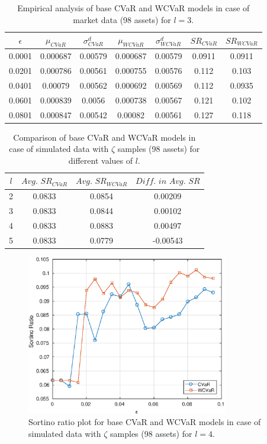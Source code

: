 \documentclass[12pt]{article}
\numberwithin{equation}{section}
\begin{document}
\begin{table}[!h]
\centering
\captionsetup{justification=centering}
\begin{tabular}{||c|c|c|c|c|c|c||}
\hline
$\epsilon$ & $\mu_{CVaR}$ & $\sigma_{CVaR}^{d}$ & $\mu_{WCVaR}$ & $\sigma_{WCVaR}^{d}$ & $SR_{CVaR}$ & $SR_{WCVaR}$\\
\hline
0.0001 & 0.000687 & 0.00579 & 0.000687 & 0.00579 & 0.0911 & 0.0911 \\
0.0201 & 0.000786 & 0.00561 & 0.000755 & 0.00576 & 0.112 & 0.103 \\
0.0401 & 0.00079 & 0.00562 & 0.000692 & 0.00569 & 0.112 & 0.0935 \\
0.0601 & 0.000839 & 0.0056 & 0.000738 & 0.00567 & 0.121 & 0.102 \\
0.0801 & 0.000847 & 0.00542 & 0.00082 & 0.00561 & 0.127 & 0.118 \\
\hline
\end{tabular}
\caption{Empirical analysis of base CVaR and WCVaR models in case of market data (98 assets) for $l=3$.}
\label{tab:6.4}
\end{table}

\begin{table}[!h]
\centering
\captionsetup{justification=centering}
\begin{tabular}{||c|c|c|c||}
\hline
$l$ & $Avg. \, \, SR_{CVaR}$ & $Avg. \, \, SR_{WCVaR}$ & $Diff. \, \, in \, \, Avg. \, \, SR$ \\
\hline
2 & 0.0833 & 0.0854 & 0.00209 \\
3 & 0.0833 & 0.0844 & 0.00102 \\
4 & 0.0833 & 0.0883 & 0.00497 \\
5 & 0.0833 & 0.0779 & -0.00543 \\
\hline
\end{tabular}
\caption{Comparison of base CVaR and WCVaR models in case of simulated data with $\zeta$ samples (98 assets) for different values of $l$.}
\label{avgtab:6.5}
\end{table}

\begin{figure}[!h]
\centering
\includegraphics[height=7.0cm]{cvar_100s_exact_4.eps}
\caption{Sortino ratio plot for base CVaR and WCVaR models in case of simulated data with $\zeta$ samples (98 assets) for $l=4$.}
\label{fig:6.5}
\end{figure}
\end{document}
